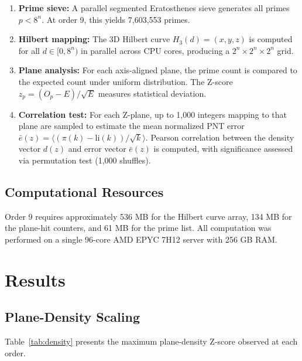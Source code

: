 \documentclass[11pt,a4paper]{article}
\begin{document}
\begin{enumerate}
\item \textbf{Prime sieve:} A parallel segmented Eratosthenes sieve
   generates all primes $p < 8^n$. At order 9, this yields 7,603,553
   primes.

\item \textbf{Hilbert mapping:} The 3D Hilbert curve $H_3(d) = (x,y,z)$
   is computed for all $d \in [0, 8^n)$ in parallel across CPU cores,
   producing a $2^n \times 2^n \times 2^n$ grid.

\item \textbf{Plane analysis:} For each axis-aligned plane, the prime
   count is compared to the expected count under uniform distribution.
   The Z-score $z_p = (O_p - E)/\sqrt{E}$ measures statistical deviation.

\item \textbf{Correlation test:} For each Z-plane, up to 1,000 integers
   mapping to that plane are sampled to estimate the mean normalized PNT
   error $\bar{e}(z) = \langle (\pi(k) - \text{li}(k))/\sqrt{k} \rangle$.
   Pearson correlation between the density vector $d(z)$ and error vector
   $\bar{e}(z)$ is computed, with significance assessed via permutation
   test (1,000 shuffles).
\end{enumerate}

\subsection{Computational Resources}

Order 9 requires approximately 536 MB for the Hilbert curve array, 134 MB
for the plane-hit counters, and 61 MB for the prime list. All computation
was performed on a single 96-core AMD EPYC 7H12 server with 256 GB RAM.

\section{Results}

\subsection{Plane-Density Scaling}

Table~\ref{tab:density} presents the maximum plane-density Z-score
observed at each order.
\end{document}
